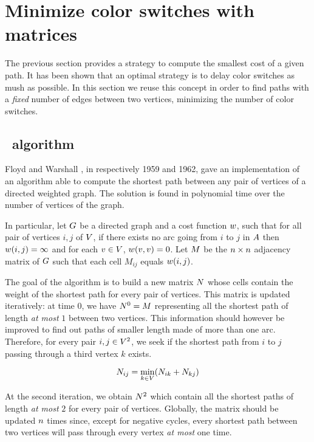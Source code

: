 \section{Minimize color switches with matrices}

The previous section provides a strategy to compute the smallest cost of a given path. It has been shown that an optimal strategy is to delay color switches as mush as possible. In this section we reuse this concept in order to find paths with a \textit{fixed} number of edges between two vertices, minimizing the number of color switches.

\subsection{\FW\ algorithm}
\label{sec:fwalgo}

Floyd \cite[]{floyd} and Warshall \cite{warshall}, in respectively 1959 and 1962, gave an implementation \cite[]{floydalgo} of an algorithm able to compute the shortest path between any pair of vertices of a directed weighted graph. The solution is found in polynomial time over the number of vertices of the graph.

In particular, let $G$ be a directed graph and a cost function $w$, such that for all pair of vertices $i,j$ of $V$, if there exists no arc going from $i$ to $j$ in $A$ then $w(i,j) = \infty$ and for each $v \in V$, $w(v, v) = 0$. Let $M$ be the $n \times n$ adjacency matrix of $G$ such that each cell $M_{ij}$ equals $w(i, j)$.

The goal of the algorithm is to build a new matrix $N$ whose cells contain the weight of the shortest path for every pair of vertices. This matrix is updated iteratively: at time $0$, we have $N^0 = M$ representing all the shortest path of length \textit{at most} $1$ between two vertices. This information should however be improved to find out paths of smaller length made of more than one arc. Therefore, for every pair $i, j \in V^2$, we seek if the shortest path from $i$ to $j$ passing through a third vertex $k$ exists.

\begin{equation}
  \label{eq:cellc}
  N_{ij} = \min_{k \in V} (N_{ik} + N_{kj})
\end{equation}

At the second iteration, we obtain $N^2$ which contain all the shortest paths of length \textit{at most} $2$ for every pair of vertices. Globally, the matrix should be updated $n$ times since, except for negative cycles, every shortest path between two vertices will pass through every vertex \textit{at most} one time.

